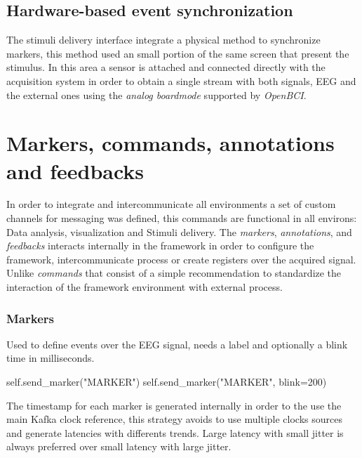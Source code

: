 


\subsection{Hardware-based event synchronization}

The stimuli delivery interface integrate a physical method to synchronize markers, this method used an small portion of the same screen that present the stimulus. In this area a sensor is attached and connected directly with the acquisition system in order to obtain a single stream with both signals, EEG and the external ones using the \textit{analog boardmode} supported by \textit{OpenBCI}.



\section{Markers, commands, annotations and feedbacks}

In order to integrate and intercommunicate all environments a set of custom channels for messaging was defined, this commands are functional in all environs: Data analysis, visualization and Stimuli delivery. The \textit{markers}, \textit{annotations}, and \textit{feedbacks} interacts internally in the framework in order to configure the framework, intercommunicate process or create registers over the acquired signal. Unlike \textit{commands} that consist of a simple recommendation to standardize the interaction of the framework environment with external process.

\subsubsection{Markers}

Used to define events over the EEG signal, needs a label and optionally a blink time in milliseconds.
\begin{python}
self.send_marker("MARKER")
self.send_marker("MARKER", blink=200)
\end{python}
The timestamp for each marker is generated internally in order to the use the main Kafka clock reference, this strategy avoids to use multiple clocks sources and generate latencies with differents trends. Large latency with small jitter is always preferred over small latency with large jitter.


